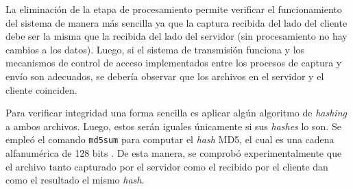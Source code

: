 \documentclass[../../main.tex]{subfiles}
\begin{document}
La eliminación de la etapa de procesamiento permite verificar el funcionamiento del sistema de manera más sencilla ya que la captura recibida del lado del cliente debe ser la misma que la recibida del lado del servidor (sin procesamiento no hay cambios a los datos). Luego, si el sistema de transmisión funciona y los mecanismos de control de acceso implementados entre los procesos de captura y envío son adecuados, se debería observar que los archivos en el servidor y el cliente coinciden.

Para verificar integridad una forma sencilla es aplicar algún algoritmo de \textit{hashing}  a ambos archivos. Luego, estos serán iguales únicamente si sus \textit{hashes} lo son. Se empleó el comando \texttt{md5sum} para computar el \textit{hash} MD5, el cual es una cadena alfanumérica de 128 bits . De esta manera, se comprobó experimentalmente que el archivo tanto capturado por el servidor como el recibido por el cliente dan como el resultado el mismo \textit{hash}.

\end{document}
